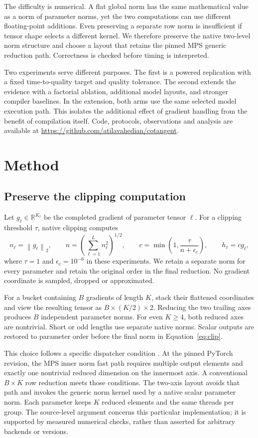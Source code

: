 \documentclass[11pt]{article}
\newcommand{\R}{\mathbb{R}}
\newcommand{\norm}[1]{\left\lVert #1\right\rVert_2}
\begin{document}
The difficulty is numerical. A flat global norm has the same mathematical value
as a norm of parameter norms, yet the two computations can use different
floating-point additions. Even preserving a separate row norm is insufficient
if tensor shape selects a different kernel. We therefore preserve the native
two-level norm structure and choose a layout that retains the pinned MPS generic
reduction path. Correctness is checked before timing is interpreted.

Two experiments serve different purposes. The first is a powered replication
with a fixed time-to-quality target and quality tolerance. The second extends
the evidence with a factorial ablation, additional model layouts, and stronger
compiler baselines. In the extension, both arms use the same selected model
execution path. This isolates the additional effect of gradient handling from
the benefit of compilation itself. Code, protocols, observations and analysis
are available at \url{https://github.com/atilavahedian/cotangent}.

\section{Method}
\subsection{Preserve the clipping computation}
Let $g_\ell\in\R^{K_\ell}$ be the completed gradient of parameter tensor $\ell$.
For a clipping threshold $\tau$, native clipping computes
\begin{equation}
 n_\ell=\norm{g_\ell},\qquad
 n=\left(\sum_{\ell=1}^{L}n_\ell^2\right)^{1/2},\qquad
 c=\min\left(1,\frac{\tau}{n+\epsilon_c}\right),\qquad h_\ell=cg_\ell,
 \label{eq:clip}
\end{equation}
where $\tau=1$ and $\epsilon_c=10^{-6}$ in these experiments. We retain a
separate norm for every parameter and retain the original order in the final
reduction. No gradient coordinate is sampled, dropped or approximated.

For a bucket containing $B$ gradients of length $K$, stack their flattened
coordinates and view the resulting tensor as $B\times(K/2)\times2$. Reducing
the two trailing axes produces $B$ independent parameter norms. For even
$K\ge4$, both reduced axes are nontrivial. Short or odd lengths use separate
native norms. Scalar outputs are restored to parameter order before the final
norm in Equation~\ref{eq:clip}.

This choice follows a specific dispatcher condition \cite{mps}. At the pinned PyTorch
revision, the MPS inner norm fast path requires multiple output elements and
exactly one nontrivial reduced dimension on the innermost axis. A conventional
$B\times K$ row reduction meets those conditions. The two-axis layout avoids
that path and invokes the generic norm kernel used by a native scalar parameter
norm. Each parameter keeps $K$ reduced elements and the same threads per group.
The source-level argument concerns this particular implementation; it is
supported by measured numerical checks, rather than asserted for arbitrary
backends or versions.
\end{document}
